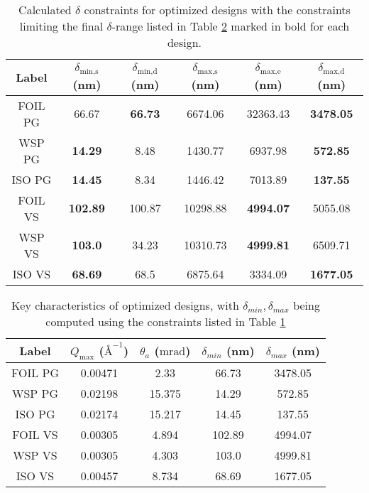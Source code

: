 \begin{table}[h!]
	\centering
	\begin{tabular}{c|cc|ccc}
		\toprule
		Label & $\delta_{\text{min,s}}$ (nm) & $\delta_{\text{min,d}}$ (nm) & $\delta_{\text{max,s}}$ (nm) & $\delta_{\text{max,e}}$ (nm) & $\delta_{\text{max,d}}$ (nm) \\
		\midrule
		FOIL PG & 66.67 & \textbf{66.73} & 6674.06 & 32363.43 & \textbf{3478.05} \\
		WSP PG & \textbf{14.29} & 8.48 & 1430.77 & 6937.98 & \textbf{572.85} \\
		ISO PG & \textbf{14.45} & 8.34 & 1446.42 & 7013.89 & \textbf{137.55} \\
		FOIL VS & \textbf{102.89} & 100.87 & 10298.88 & \textbf{4994.07} & 5055.08 \\
		WSP VS & \textbf{103.0} & 34.23 & 10310.73 & \textbf{4999.81} & 6509.71 \\
		ISO VS & \textbf{68.69} & 68.5 & 6875.64 & 3334.09 & \textbf{1677.05} \\
		\bottomrule
	\end{tabular}
	\caption{Calculated $\delta$ constraints for optimized designs with the constraints limiting the final $\delta$-range listed in Table \ref{tab:optimized-designs-performance} marked in bold for each design.}
	\label{tab:optimized-designs-delta-constraints}
\end{table}

\begin{table}[h!]
	\centering
	\begin{tabular}{c | c c c c}
		\toprule
		Label & $Q_{\text{max}}$ ($\text{\AA}^{-1}$) & $\theta_a$ ($\unit{\milli\radian}$) & $\delta_{min}$ (nm) & $\delta_{max}$ (nm) \\
		\midrule
		FOIL PG & 0.00471 & 2.33 & 66.73 & 3478.05 \\
		WSP PG & 0.02198 & 15.375 & 14.29 & 572.85 \\
		ISO PG & 0.02174 & 15.217 & 14.45 & 137.55 \\
		FOIL VS & 0.00305 & 4.894 & 102.89 & 4994.07 \\
		WSP VS & 0.00305 & 4.303 & 103.0 & 4999.81 \\
		ISO VS & 0.00457 & 8.734 & 68.69 & 1677.05 \\
		\bottomrule
	\end{tabular}
	\caption{Key characteristics of optimized designs, with $\delta_{min}, \delta_{max}$ being computed using the constraints listed in Table \ref{tab:optimized-designs-delta-constraints}}
	\label{tab:optimized-designs-performance}
\end{table}

